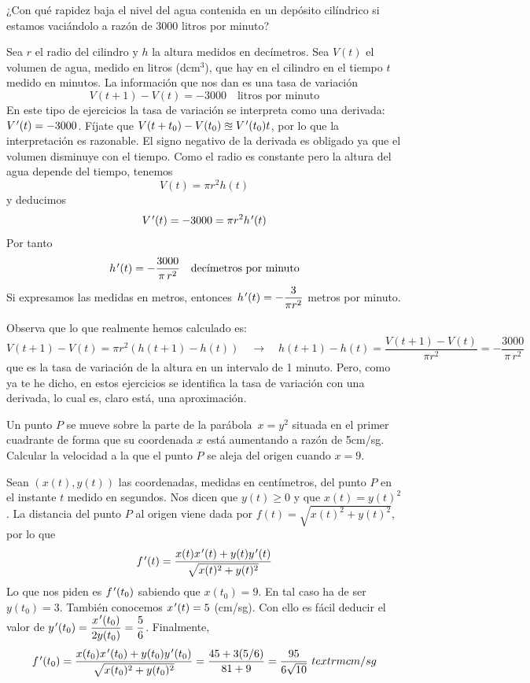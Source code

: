 \begin{ejercicios resueltos} \resuelto ¿Con qué rapidez baja el
nivel del agua contenida en un depósito cilíndrico si estamos vaciándolo
a razón de 3000 litros por minuto?

\sol Sea $r$ el radio del cilindro y $h$ la altura medidos en decímetros.
Sea $V(t)$ el volumen de agua, medido en litros (dcm$^{3}$), que
hay en el cilindro en el tiempo $t$ medido en minutos. La información
que nos dan es una tasa de variación 
\[
V(t+1)-V(t)=-3000\quad\textrm{litros por minuto}
\]
En este tipo de ejercicios la tasa de variación se interpreta como
una derivada: $V\mbox{$^{\mspace{2mu}\prime}$}(t)=-3000$. Fíjate que $V(t+t_{0})-V(t_{0})\approxeq V\mbox{$^{\mspace{2mu}\prime}$}(t_{0})t$,
por lo que la interpretación es razonable. El signo negativo de la
derivada es obligado ya que el volumen disminuye con el tiempo. Como
el radio es constante pero la altura del agua depende del tiempo,
tenemos 
\[
V(t)=\pi r^{2}h(t)
\]
y deducimos 
\[
V\mbox{$^{\mspace{2mu}\prime}$}(t)=-3000=\pi r^{2}h\mbox{$^{\mspace{2mu}\prime}$}(t)
\]
Por tanto 
\[
h\mbox{$^{\mspace{2mu}\prime}$}(t)=-\dfrac{3000}{\pi\,r^{2}}\quad\textrm{decímetros por minuto}
\]
Si expresamos las medidas en metros, entonces $\,h\mbox{$^{\mspace{2mu}\prime}$}(t)=-\dfrac{3}{\pi r^{2}}$
metros por minuto.

Observa que lo que realmente hemos calculado es: 
\[
V(t+1)-V(t)=\pi r^{2}(h(t+1)-h(t))\quad\longrightarrow\quad h(t+1)-h(t)=\frac{V(t+1)-V(t)}{\pi r^{2}}=-\dfrac{3000}{\pi\,r^{2}}
\]
que es la tasa de variación de la altura en un intervalo de 1 minuto.
Pero, como ya te he dicho, en estos ejercicios se identifica la tasa
de variación con una derivada, lo cual es, claro está, una aproximación.\hecho

\resuelto Un punto $P$ se mueve sobre la parte de la parábola $\,x=y^{2}$
situada en el primer cuadrante de forma que su coordenada $x$ está
aumentando a razón de 5cm/sg. Calcular la velocidad a la que el punto
$P$ se aleja del origen cuando $x=9$.

\sol Sean $(x(t),y(t))$ las coordenadas, medidas en centímetros,
del punto $P$ en el instante $t$ medido en segundos. Nos dicen que
$y(t)\geqslant0$ y que $x(t)=y(t)^{2}$. La distancia del punto $P$
al origen viene dada por $f(t)=\sqrt{x(t)^{2}+y(t)^{2}}$, por lo
que 
\[
f\mbox{$^{\mspace{2mu}\prime}$}(t)=\frac{x(t)x\mbox{$^{\mspace{2mu}\prime}$}(t)+y(t)y\mbox{$^{\mspace{2mu}\prime}$}(t)}{\sqrt{x(t)^{2}+y(t)^{2}}}
\]
Lo que nos piden es $f\mbox{$^{\mspace{2mu}\prime}$}(t_{0})$ sabiendo que $x(t_{0})=9$. En
tal caso ha de ser $y(t_{0})=3$. También conocemos $x\mbox{$^{\mspace{2mu}\prime}$}(t)=5$ (cm/sg).
Con ello es fácil deducir el valor de $y\mbox{$^{\mspace{2mu}\prime}$}(t_{0})=\dfrac{x\mbox{$^{\mspace{2mu}\prime}$}(t_{0})}{2y(t_{0})}=\dfrac{5}{6}$.
Finalmente, 
\[
f\tl(t_{0})=\frac{x(t_{0})x\tl(t_{0})+y(t_{0})y\tl(t_{0})}{\sqrt{x(t_{0})^{2}+y(t_{0})^{2}}}=\frac{45+3(5/6)}{81+9}=\frac{95}{6\sqrt{10}}\ textrm{cm/sg}
\]
\hecho


\end{ejercicios resueltos}
